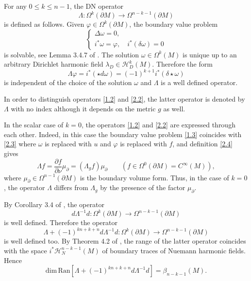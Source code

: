 \documentclass[12pt,reqno]{amsart}
\begin{document}
For any $ 0\leq k\leq n-1 $, the DN operator
\begin{equation}
\Lambda :\Omega^{k}(\partial M)
\rightarrow \Omega^{n-k-1}(\partial M)
                                \label{2.2}
\end{equation}
is defined as follows. Given $ \varphi\in\Omega^{k}(\partial M) $,
the boundary value problem
\begin{equation}
\left\{
\begin{array}{l}
\Delta\omega=0,\\
i^*\omega=\varphi,\quad i^*(\delta\omega)=0
\end{array}
\right.
                                \label{2.3}
\end{equation}
is solvable, see Lemma 3.4.7 of \cite{Sch}. The solution
$ \omega\in\Omega^{k}(M) $ is unique up to an arbitrary Dirichlet
harmonic field $ \lambda_D\in{\mathcal H}^k_D(M) $. Therefore the form
\begin{equation}
\Lambda\varphi
= i^*(\star d\omega)=(-1)^{k+1}i^*(\delta\star\omega)
                                \label{2.4}
\end{equation}
is independent of the choice of the solution $ \omega $ and
$ \Lambda $ is a well defined operator.

In order to distinguish operators \eqref{1.2} and \eqref{2.2}, the latter operator is denoted by $\Lambda$ with no index although it depends on the metric $g$ as well.

In the scalar case of $ k=0 $, the operators \eqref{1.2} and \eqref{2.2} are expressed through each other. Indeed, in this case the boundary value problem \eqref{1.3} coincides with \eqref{2.3} where $\omega$ is replaced with $u$ and $\varphi$ is replaced with $f$,
and definition \eqref{2.4} gives
\begin{equation}
\Lambda f=\frac {\partial f} {\partial\nu}\mu_\partial=(\Lambda_g f)\mu_\partial
\quad \quad (f\in\Omega^0(\partial M)=C^\infty(M)),
                                \label{2.5}
\end{equation}
where
$ \mu_\partial\in\Omega^{n-1}(\partial M) $ is the boundary volume
form. Thus, in the case of $ k=0 $,
the operator $ \Lambda $ differs from
$ \Lambda_g $ by the presence of the factor
$ \mu_\partial $.

By Corollary 3.4 of \cite{BS}, the operator
\begin{equation}
d\Lambda^{-1}d :\Omega^{k}(\partial M)
\rightarrow \Omega^{n-k-1}(\partial M)
                                \label{2.6}
\end{equation}
is well defined. Therefore the operator
$$
\Lambda+(-1)^{kn+k+n}d\Lambda^{-1} d:
\Omega^k(\partial M)\rightarrow\Omega^{n-k-1}(\partial M)
$$
is well defined too. By Theorem 4.2 of \cite{BS}, the range of the latter operator coincides with the space $i^*{\mathcal H}^{n-k-1}_N(M)$ of boundary traces of Nuemann harmonic fields. Hence
\begin{equation}
\mbox{dim}\,\mbox{Ran}
\left[
\Lambda+(-1)^{kn+k+n}d\Lambda^{-1} d
\right]=
\beta_{n-k-1}(M).
                                \label{2.7}
\end{equation}
\end{document}
